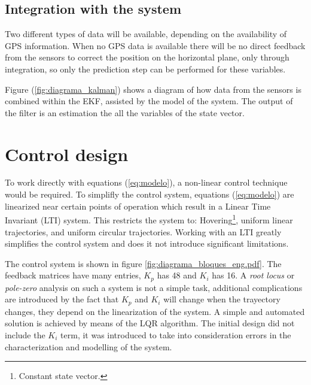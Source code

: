 \documentclass[conference]{IEEEtran}
\newcommand{\refp}[1]{(\ref{#1})}
\begin{document}
\subsection{Integration with the system}
\label{sec:kalman-integration}


Two different types of data will be available, depending on the availability of GPS information. When no GPS data is available there will be no direct feedback from the sensors to correct the position on the horizontal plane, only through integration, so only the prediction step can be performed for these variables.


Figure \refp{fig:diagrama_kalman} shows a diagram of how data from the sensors is combined within the EKF, assisted by the model of the system. The output of the filter is an estimation the all the variables of the state vector.

\section{Control design}
\label{sec:control}

To work directly with equations \refp{eq:modelo}, a non-linear control technique would be required. To simplifly the control system, equations \refp{eq:modelo} are linearized near certain points of operation which result in a Linear Time Invariant (LTI) system. This restricts the system to: Hovering\footnote{Constant state vector.}, uniform linear trajectories, and uniform circular trajectories. Working with an LTI greatly simplifies the control system and does it not introduce significant limitations.

The control system is shown in figure \ref{fig:diagrama_bloques_eng.pdf}. The feedback matrices have many entries, $K_p$ has 48 and $K_i$ has 16. A \textit{root locus} or \textit{pole-zero} analysis on such a system is not a simple task, additional complications are introduced by the fact that $K_p$ and $K_i$ will change when the trayectory changes, they depend on the linearization of the system. A simple and automated solution is achieved by means of the LQR algorithm. The initial design did not include the $K_i$ term, it was introduced to take into consideration errors in the characterization and modelling of the system.
\end{document}
